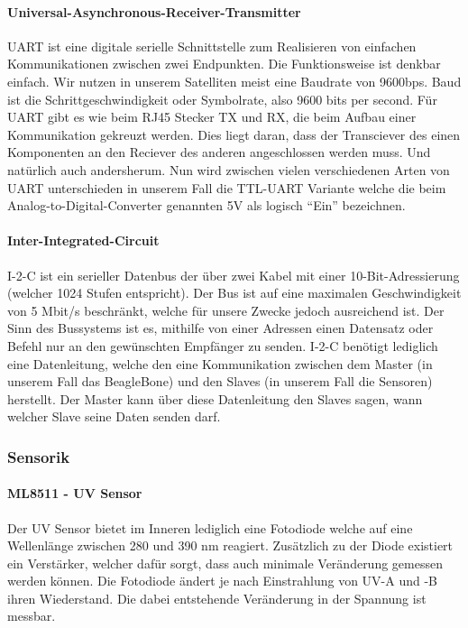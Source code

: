\paragraph{Universal-Asynchronous-Receiver-Transmitter}
UART ist eine digitale serielle Schnittstelle zum Realisieren von einfachen Kommunikationen zwischen zwei Endpunkten. Die Funktionsweise ist denkbar einfach. Wir nutzen in unserem Satelliten meist eine Baudrate von 9600bps. Baud ist die Schrittgeschwindigkeit oder Symbolrate, also 9600 bits per second. Für UART gibt es wie beim RJ45 Stecker TX und RX, die beim Aufbau einer Kommunikation gekreuzt werden. Dies liegt daran, dass der Transciever des einen Komponenten an den Reciever des anderen angeschlossen werden muss. Und natürlich auch andersherum. Nun wird zwischen vielen verschiedenen Arten von UART unterschieden in unserem Fall die TTL-UART Variante welche die beim Analog-to-Digital-Converter genannten 5V als logisch ``Ein'' bezeichnen. \\

\paragraph{Inter-Integrated-Circuit}
I-2-C ist ein serieller Datenbus der über zwei Kabel mit einer 10-Bit-Adressierung (welcher 1024 Stufen entspricht). Der Bus ist auf eine maximalen Geschwindigkeit von 5 Mbit/s beschränkt, welche für unsere Zwecke jedoch ausreichend ist. Der Sinn des Bussystems ist es, mithilfe von einer Adressen einen Datensatz oder Befehl nur an den gewünschten Empfänger zu senden. I-2-C benötigt lediglich eine Datenleitung, welche den eine Kommunikation zwischen dem Master (in unserem Fall das BeagleBone) und den Slaves (in unserem Fall die Sensoren) herstellt. Der Master kann über diese Datenleitung den Slaves sagen, wann welcher Slave seine Daten senden darf.

\subsubsection{Sensorik}
\paragraph{ML8511 - UV Sensor}
Der UV Sensor bietet im Inneren lediglich eine Fotodiode welche auf eine Wellenlänge zwischen 280 und 390 nm reagiert. Zusätzlich zu der Diode existiert ein Verstärker, welcher dafür sorgt, dass auch minimale Veränderung gemessen werden können. Die Fotodiode ändert je nach Einstrahlung von UV-A und -B ihren Wiederstand. Die dabei entstehende Veränderung in der Spannung ist messbar.

